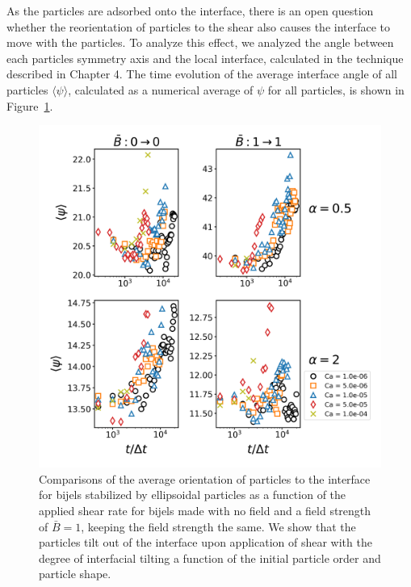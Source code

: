 As the particles are adsorbed onto the interface, there is an open question whether the reorientation of particles to the shear also causes the interface to move with the
particles. To analyze this effect, we analyzed the angle between each particles symmetry axis and the local interface, calculated in the technique described in Chapter 4.
The time evolution of the average interface angle of all particles $\langle \psi \rangle$, calculated as a numerical average of $\psi$ for all particles, is shown in 
Figure~\ref{fig:interface_angle_shear}.

\begin{figure} 
    \centering 
    \includegraphics[scale=0.5]{../figures/results/paper3/psi-time_compare-specific.png} 
    \caption{Comparisons of the average orientation of particles to the interface for bijels stabilized by
             ellipsoidal particles as a function of the applied shear rate for bijels made with no field and a field strength of $\bar{B} = 1$,
             keeping the field strength the same. We show that the particles tilt out of the interface upon application of shear with the degree of
             interfacial tilting a function of the initial particle order and particle shape.} 
    \label{fig:interface_angle_shear} 
\end{figure}

